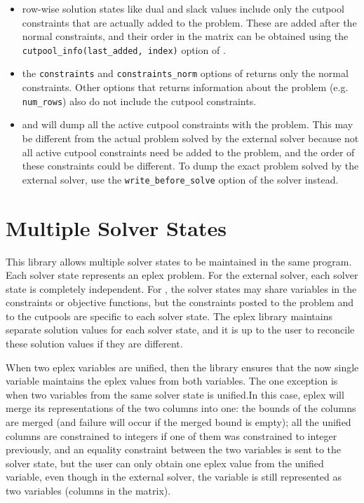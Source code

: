 \begin{itemize}
\item row-wise solution states like dual and slack values include only the
cutpool constraints that are actually added to the problem. These are added
after the normal constraints, and their order in the matrix can be obtained
using the {\tt cutpool_info(last_added, index)} option of
. 
\item the {\tt constraints} and {\tt constraints_norm} options of
 returns only the normal
constraints. Other options that returns information about the problem
(e.g. {\tt num_rows}) also do not include the cutpool constraints.  
\item 
{} and 
 will dump all 
the active cutpool constraints with the problem. This may be different from
the actual problem solved by the external solver because not all active
cutpool constraints need be added to the problem, and the order of these
constraints could be different. To dump the exact problem solved by the
external solver, use the {\tt write_before_solve} option of the solver
instead. 
\end{itemize}

\section{Multiple Solver States}

This library allows multiple solver states to be maintained in the same
program. Each solver state represents an eplex problem. For the external
solver, each solver state is completely independent. For {\eclipse}, the
solver states may share variables in the constraints or objective
functions, but the constraints posted to the problem and to the cutpools
are specific to each solver state. The eplex library maintains separate
solution values for each solver state, and it is up to the user to
reconcile these solution values if they are different.

When two eplex variables are unified, then the library ensures that the
now single variable maintains the eplex values from both variables. The one
exception is when two variables from the same solver state is unified.In
this case, eplex will merge its representations of the two columns into one:
the bounds of the columns are merged (and failure will occur if the
merged bound is empty); all the unified columns are constrained to integers
if one of them was constrained to integer previously, and 
an equality constraint between the two variables is sent to the
solver state, but the user can only obtain one eplex value from the unified
variable, even though in the external solver, the variable is still
represented as two variables (columns in the matrix). 

